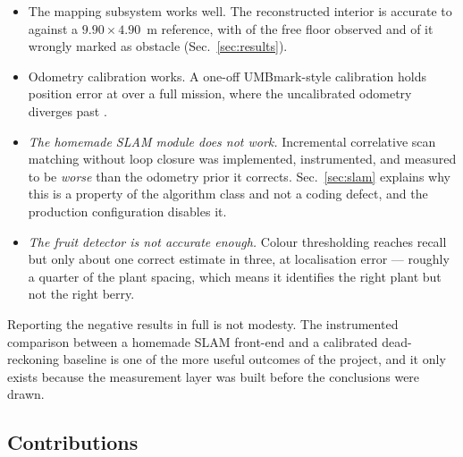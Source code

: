 \begin{itemize}[leftmargin=*,itemsep=1pt,topsep=2pt]
  \item The mapping subsystem works well. The reconstructed interior is
        accurate to  against a
        $9.90 \times 4.90$~m reference, with  of the
        free floor observed and  of it wrongly marked as
        obstacle (Sec.~\ref{sec:results}).
  \item Odometry calibration works. A one-off UMBmark-style calibration
        \cite{borenstein1996umbmark} holds position error at
         over a full mission, where the uncalibrated
        odometry diverges past .
  \item \emph{The homemade SLAM module does not work.} Incremental
        correlative scan matching without loop closure was implemented,
        instrumented, and measured to be \emph{worse} than the odometry
        prior it corrects. Sec.~\ref{sec:slam} explains why this is a
        property of the algorithm class and not a coding defect, and the
        production configuration disables it.
  \item \emph{The fruit detector is not accurate enough.} Colour
        thresholding reaches  recall but only about one
        correct estimate in three, at  localisation
        error --- roughly a quarter of the plant spacing, which means it
        identifies the right plant but not the right berry.
\end{itemize}

Reporting the negative results in full is not modesty. The instrumented
comparison between a homemade SLAM front-end and a calibrated dead-reckoning
baseline is one of the more useful outcomes of the project, and it only
exists because the measurement layer was built before the conclusions
were drawn.

\subsection{Contributions}

